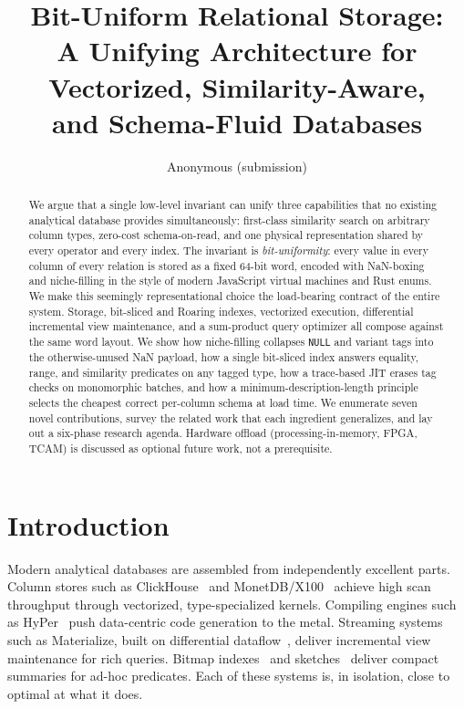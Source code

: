 \documentclass[10pt]{article}
\title{Bit-Uniform Relational Storage:\\
A Unifying Architecture for Vectorized, Similarity-Aware,\\
and Schema-Fluid Databases}
\author{Anonymous (submission)}
\date{}
\begin{document}
\maketitle

\begin{abstract}
We argue that a single low-level invariant can unify three capabilities
that no existing analytical database provides simultaneously:
first-class similarity search on arbitrary column types, zero-cost
schema-on-read, and one physical representation shared by every
operator and every index. The invariant is \emph{bit-uniformity}:
every value in every column of every relation is stored as a fixed
64-bit word, encoded with NaN-boxing and niche-filling in the style of
modern JavaScript virtual machines and Rust enums. We make this
seemingly representational choice the load-bearing contract of the
entire system. Storage, bit-sliced and Roaring indexes, vectorized
execution, differential incremental view maintenance, and a
sum-product query optimizer all compose against the same word layout.
We show how niche-filling collapses \texttt{NULL} and variant tags into
the otherwise-unused NaN payload, how a single bit-sliced index answers
equality, range, and similarity predicates on any tagged type, how a
trace-based JIT erases tag checks on monomorphic batches, and how a
minimum-description-length principle selects the cheapest correct
per-column schema at load time. We enumerate seven novel contributions,
survey the related work that each ingredient generalizes, and lay out a
six-phase research agenda. Hardware offload (processing-in-memory,
FPGA, TCAM) is discussed as optional future work, not a prerequisite.
\end{abstract}

\section{Introduction}
\label{sec:intro}

Modern analytical databases are assembled from independently excellent
parts. Column stores such as ClickHouse~\citep{schulze2024clickhouse}
and MonetDB/X100~\citep{boncz2005monetdb} achieve high scan throughput
through vectorized, type-specialized kernels. Compiling engines such as
HyPer~\citep{neumann2011hyper} push data-centric code generation to the
metal. Streaming systems such as Materialize, built on differential
dataflow~\citep{mcsherry2013differential,budiu2023dbsp}, deliver
incremental view maintenance for rich queries. Bitmap
indexes~\citep{oneil1997improved,chan1998bitmap,chambi2016roaring} and
sketches~\citep{flajolet2007hyperloglog,cormode2005countmin} deliver
compact summaries for ad-hoc predicates. Each of these systems is, in
isolation, close to optimal at what it does.
\end{document}
